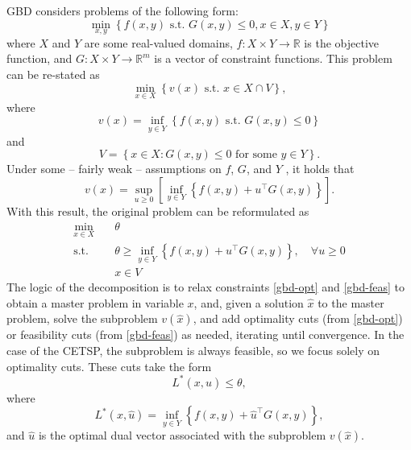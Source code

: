 \documentclass[pdflatex,sn-mathphys-num]{sn-jnl}%
\newcommand*{\transpose}{^{\top}}
\begin{document}
GBD considers problems of the following form:
\begin{equation}
    \min_{x,y} \left\{f(x,y) \text{ s.t. } G(x,y) \leq 0, x\in X, y \in Y\right\}
\end{equation}
where $X$ and $Y$ are some real-valued domains, $f: X \times Y \rightarrow \mathbb{R}$ is the objective function, and $G: X \times Y \rightarrow \mathbb{R}^m$ is a vector of constraint functions. This problem can be re-stated as
\begin{equation}
    \min_{x \in X} \left\{v(x) \text{ s.t. } x \in X\cap V\right\},
\end{equation}
where
\begin{equation}
    v(x) = \inf_{y\in Y} \left\{f(x,y) \text{ s.t. } G(x,y) \leq 0\right\}
\end{equation}
and
\begin{equation}
    V = \left\{x \in X: G(x,y) \leq 0 \text{ for some } y\in Y\right\}.
\end{equation}
Under some -- fairly weak -- assumptions on $f$, $G$, and $Y$ \cite{gbd}, it holds that
\begin{equation}
    v(x) = \sup_{u \geq 0} \left[\inf_{y\in Y} \left\{f(x,y) + u\transpose G(x,y)\right\}\right].
\end{equation}
With this result, the original problem can be reformulated as
\begin{align}
    \min_{x\in X}\quad & \theta \\
    \text{s.t.} \quad& \theta \geq \inf_{y\in Y} \left\{f(x,y) + u\transpose G(x,y)\right\}, \quad \forall u \geq 0  \label{gbd-opt}\\
    & x \in V \label{gbd-feas}
\end{align}
The logic of the decomposition is to relax constraints \eqref{gbd-opt} and \eqref{gbd-feas} to obtain a master problem in variable $x$, and, given a solution $\hat{x}$ to the master problem, solve the subproblem $v(\hat{x})$, and add optimality cuts (from \eqref{gbd-opt}) or feasibility cuts (from \eqref{gbd-feas}) as needed, iterating until convergence. In the case of the CETSP, the subproblem is always feasible, so we focus solely on optimality cuts. These cuts take the form
\begin{equation}\label{gbd-cut}
    L^*(x, \hat{u}) \leq \theta,
\end{equation}
where
\begin{equation}
    L^*(x, \hat{u}) = \inf_{y\in Y} \left\{f(x,y) + \hat{u}\transpose G(x,y)\right\},
\end{equation}
and $\hat{u}$ is the optimal dual vector associated with the subproblem $v(\hat{x})$.
\end{document}
